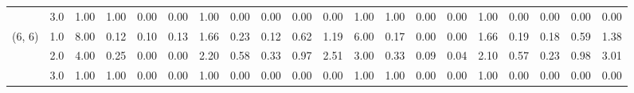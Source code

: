 \begin{tabular}{llrrrrrrrrrrrrrrrrrr}
       & 3.0 &               1.00 &                     1.00 &                                 0.00 &                             0.00 &                           1.00 &                                               0.00 &                                            0.00 &                                            0.00 &                                        0.00 &               1.00 &                     1.00 &                                 0.00 &                             0.00 &                           1.00 &                                               0.00 &                                            0.00 &                                            0.00 &                                        0.00 \\
(6, 6) & 1.0 &               8.00 &                     0.12 &                                 0.10 &                             0.13 &                           1.66 &                                               0.23 &                                            0.12 &                                            0.62 &                                        1.19 &               6.00 &                     0.17 &                                 0.00 &                             0.00 &                           1.66 &                                               0.19 &                                            0.18 &                                            0.59 &                                        1.38 \\
       & 2.0 &               4.00 &                     0.25 &                                 0.00 &                             0.00 &                           2.20 &                                               0.58 &                                            0.33 &                                            0.97 &                                        2.51 &               3.00 &                     0.33 &                                 0.09 &                             0.04 &                           2.10 &                                               0.57 &                                            0.23 &                                            0.98 &                                        3.01 \\
       & 3.0 &               1.00 &                     1.00 &                                 0.00 &                             0.00 &                           1.00 &                                               0.00 &                                            0.00 &                                            0.00 &                                        0.00 &               1.00 &                     1.00 &                                 0.00 &                             0.00 &                           1.00 &                                               0.00 &                                            0.00 &                                            0.00 &                                        0.00 \\
\bottomrule
\end{tabular}
